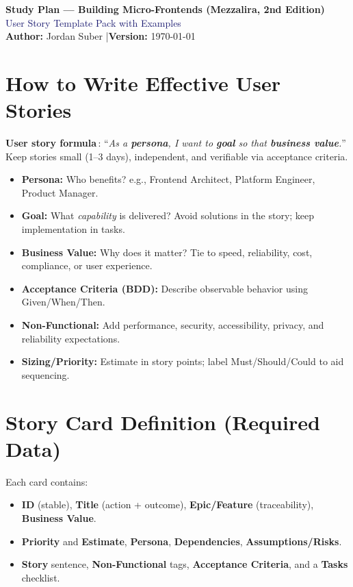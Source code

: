 \documentclass[11pt,a4paper]{article}
\newcommand{\Meta}{MidnightBlue}
\begin{document}
\begin{center}
  {\Large \textbf{Study Plan — Building Micro-Frontends (Mezzalira, 2nd Edition)}}\\[2pt]
  \textcolor{\Meta}{User Story Template Pack with Examples}\\[8pt]
  \normalsize \textbf{Author:} Jordan Suber \quad|\quad \textbf{Version:} \today
\end{center}

\section*{How to Write Effective User Stories}
\textbf{User story formula}\,: ``\emph{As a \textbf{persona}, I want to \textbf{goal} so that \textbf{business value}.}'' Keep stories small (1--3 days), independent, and verifiable via acceptance criteria.
\begin{itemize}
  \item \textbf{Persona:} Who benefits? e.g., Frontend Architect, Platform Engineer, Product Manager.
  \item \textbf{Goal:} What \emph{capability} is delivered? Avoid solutions in the story; keep implementation in tasks.
  \item \textbf{Business Value:} Why does it matter? Tie to speed, reliability, cost, compliance, or user experience.
  \item \textbf{Acceptance Criteria (BDD):} Describe observable behavior using Given/When/Then.
  \item \textbf{Non-Functional:} Add performance, security, accessibility, privacy, and reliability expectations.
  \item \textbf{Sizing/Priority:} Estimate in story points; label Must/Should/Could to aid sequencing.
\end{itemize}

\section*{Story Card Definition (Required Data)}
Each card contains:
\begin{itemize}
  \item \textbf{ID} (stable), \textbf{Title} (action + outcome), \textbf{Epic/Feature} (traceability), \textbf{Business Value}.
  \item \textbf{Priority} and \textbf{Estimate}, \textbf{Persona}, \textbf{Dependencies}, \textbf{Assumptions/Risks}.
  \item \textbf{Story} sentence, \textbf{Non-Functional} tags, \textbf{Acceptance Criteria}, and a \textbf{Tasks} checklist.
\end{itemize}
\end{document}

